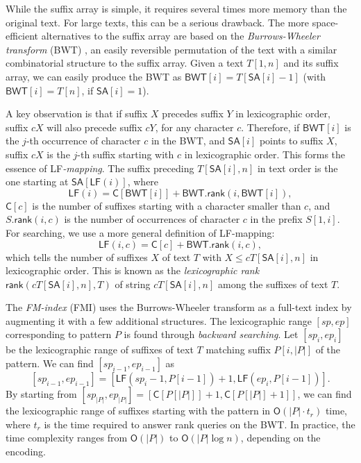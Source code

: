 \documentclass[smallabstract,smallcaptions]{dccpaper}
\newcommand{\abs}[1]{\ensuremath{\lvert #1 \rvert}}
\newcommand{\Oh}{\ensuremath{\mathsf{O}}}
\newcommand{\BWT}{\textsf{BWT}}
\newcommand{\FMI}{\textsf{FMI}}
\newcommand{\mSA}{\ensuremath{\mathsf{SA}}}
\newcommand{\mBWT}{\ensuremath{\mathsf{BWT}}}
\newcommand{\mC}{\ensuremath{\mathsf{C}}}
\newcommand{\LF}{\textsf{LF}}
\newcommand{\rank}{\textsf{rank}}
\newcommand{\mLF}{\ensuremath{\mathsf{LF}}}
\newcommand{\mrank}{\ensuremath{\mathsf{rank}}}
\begin{document}
While the suffix array is simple, it requires several times more memory than the original text. For large texts, this can be a serious drawback. The more space-efficient alternatives to the suffix array are based on the \emph{Burrows-Wheeler transform} (\BWT) \cite{Burrows1994}, an easily reversible permutation of the text with a similar combinatorial structure to the suffix array. Given a text $T[1,n]$ and its suffix array, we can easily produce the \BWT{} as $\mBWT[i] = T[\mSA[i]-1]$ (with $\mBWT[i] = T[n]$, if $\mSA[i] = 1$).

A key observation is that if suffix $X$ precedes suffix $Y$ in lexicographic order, suffix $cX$ will also precede suffix $cY$, for any character $c$. Therefore, if $\mBWT[i]$ is the $j$\nobreakdash-th occurrence of character $c$ in the \BWT, and $\mSA[i]$ points to suffix $X$, suffix $cX$ is the $j$\nobreakdash-th suffix starting with $c$ in lexicographic order. This forms the essence of \LF\emph{\nobreakdash-mapping}. The suffix preceding $T[\mSA[i],n]$ in text order is the one starting at $\mSA[\mLF(i)]$, where
$$
\mLF(i) = \mC[\mBWT[i]] + \mBWT.\mrank(i, \mBWT[i]),
$$
$\mC[c]$ is the number of suffixes starting with a character smaller than $c$, and $S.\mrank(i,c)$ is the number of occurrences of character $c$ in the prefix $S[1,i]$. For searching, we use a more general definition of \LF\nobreakdash-mapping:
$$
\mLF(i,c) = \mC[c] + \mBWT.\mrank(i, c),
$$
which tells the number of suffixes $X$ of text $T$ with $X \le c T[\mSA[i],n]$ in lexicographic order. This is known as the \emph{lexicographic rank} $\mrank(cT[\mSA[i],n], T)$ of string $cT[\mSA[i],n]$ among the suffixes of text $T$.

The \emph{FM-index} (\FMI) \cite{Ferragina2005a} uses the Burrows-Wheeler transform as a full-text index by augmenting it with a few additional structures. The lexicographic range $[sp,ep]$ corresponding to pattern $P$ is found through \emph{backward searching}. Let $[sp_{i},ep_{i}]$ be the lexicographic range of suffixes of text $T$ matching suffix $P[i, \abs{P}]$ of the pattern. We can find $[sp_{i-1},ep_{i-1}]$ as
$$
[sp_{i-1},ep_{i-1}] = [\mLF(sp_{i}-1, P[i-1]) + 1, \mLF(ep_{i}, P[i-1])].
$$
By starting from $[sp_{\abs{P}}, ep_{\abs{P}}] = [\mC[P[\abs{P}]]+1, \mC[P[\abs{P}]+1]]$, we can find the lexicographic range of suffixes starting with the pattern in $\Oh(\abs{P} \cdot t_{r})$ time, where $t_{r}$ is the time required to answer \rank{} queries on the \BWT. In practice, the time complexity ranges from $\Oh(\abs{P})$ to $\Oh(\abs{P} \log n)$, depending on the encoding.
\end{document}

